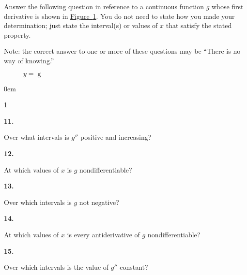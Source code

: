 \documentclass[12pt,]{book}
\theoremstyle{plain}
\theoremstyle{definition}
\numberwithin{equation}{section}
\newenvironment{exercisegroup}%
{\medskip\noindent}%
{\par\bigskip}%
\newlength{\exercisegroupindent}%
\newlength{\exercisegroupitemwidth}%
\newenvironment{exercisegrouplist}%
{\vspace{-\partopsep}%
\begin{adjustwidth}{\exercisegroupindent}{0em}}%
{\end{adjustwidth}%
\vspace{-\partopsep}%
\vspace{\baselineskip}}%
\newenvironment{exercisegroupbycol}[1]%
{\begin{exercisegrouplist}%
\vspace{-\multicolsep}%
\begin{multicols}{#1}%
\setlength{\parindent}{0em}%
\setlength{\exercisegroupitemwidth}{\linewidth}}%
{\end{multicols}%
\vspace{-\multicolsep}%
\end{exercisegrouplist}}%
\newenvironment{exercisegroupitem}[1]%
{\begin{minipage}[t]{\exercisegroupitemwidth}
\vspace{0pt}%
{\bfseries#1}%
\rule{0pt}{\baselineskip}}{\strut%
\end{minipage}%
\hspace{\columnsep}}%
\providecommand\phantomsection{}
\newcommand{\fe}[2]{\mathop{{#1}{\left(#2\right)}}}
\newcommand{\sd}[1]{#1''}
\begin{document}
\begin{exercisegroup}%
Answer the following question in reference to a continuous function \(g\) whose first derivative is shown in \hyperref[figure-discontinuous-derivative]{Figure~\ref*{figure-discontinuous-derivative}}.  You do not need to state how you made your determination; just state the interval(s) or values of \(x\) that satisfy the stated property.%
\par
Note: the correct answer to one or more of these questions may be ``There is no way of knowing.''%
\begin{figure}
\centering
{
}
\caption{\(y=\fe{g}{x}\)\label{figure-discontinuous-derivative}}
\end{figure}
\begin{exercisegroupbycol}{1}%
\begin{exercisegroupitem}{11. }\phantomsection\hypertarget{exercise-194}{\null}
Over what intervals is \(\sd{g}\) positive and increasing?%
\end{exercisegroupitem}%
\par%
\begin{exercisegroupitem}{12. }\phantomsection\hypertarget{exercise-195}{\null}
At which values of \(x\) is \(g\) nondifferentiable?%
\end{exercisegroupitem}%
\par%
\begin{exercisegroupitem}{13. }\phantomsection\hypertarget{exercise-196}{\null}
Over which intervals is \(g\) not negative?%
\end{exercisegroupitem}%
\par%
\begin{exercisegroupitem}{14. }\phantomsection\hypertarget{exercise-197}{\null}
At which values of \(x\) is every antiderivative of \(g\) nondifferentiable?%
\end{exercisegroupitem}%
\par%
\begin{exercisegroupitem}{15. }\phantomsection\hypertarget{exercise-198}{\null}
Over which intervals is the value of \(\sd{g}\) constant?%

\end{exercisegroupitem}
\end{exercisegroupbycol}
\end{exercisegroup}
\end{document}
